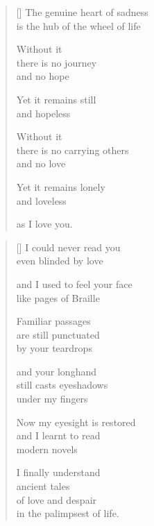 \documentclass[14pt]{extbook}
\newcommand*{\centeredornament}{\centerline{\pgfornament[width=6cm]{88}}}
\begin{document}

\newpage

\vspace*{-15mm}
\centeredornament
\vspace*{-7mm}


\settowidth{\versewidth}{is the hub of the wheel of life}

\begin{verse}[\versewidth]
  The genuine heart of sadness \\
  is the hub of the wheel of life

  Without it \\
  there is no journey \\
  and no hope

  Yet it remains still \\
  and hopeless

  Without it \\
  there is no carrying others \\
  and no love

  Yet it remains lonely \\
  and loveless

  as I love you.
\end{verse}


\newpage

\vspace*{-15mm}
\centeredornament
\vspace*{-7mm}


\settowidth{\versewidth}{Now my eyesight is restored}

\begin{verse}[\versewidth]
  I could never read you \\
  even blinded by love

  and I used to feel your face \\
  like pages of Braille

  Familiar passages \\
  are still punctuated \\
  by your teardrops

  and your longhand \\
  still casts eyeshadows \\
  under my fingers

  Now my eyesight is restored \\
  and I learnt to read \\
  modern novels

  I finally understand \\
  ancient tales \\
  of love and despair \\
  in the palimpsest of life.
\end{verse}
\end{document}
